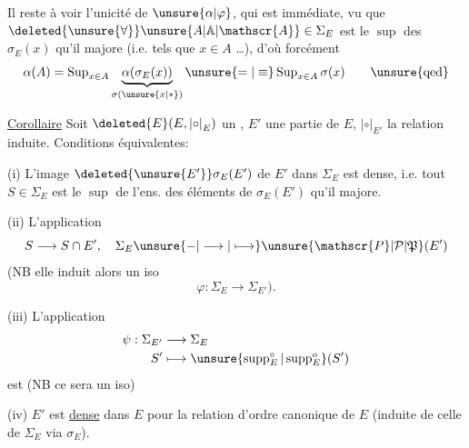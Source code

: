 Il reste à voir l'unicité de $\unsure{\alpha|\varphi}$, qui est immédiate, vu que $\deleted{\unsure{\forall}}\unsure{A|\mathbb{A}|\mathscr{A}}\in\Sigma_E$ est le $\sup$ des $\sigma_E(x)$ qu'il majore (i.e. tels que $x\in A$ \ldots),  d'où forcément
\[
\alpha(A)=\operatorname{Sup}_{x\in A}\underbrace{\alpha(\sigma_E(x))}_{\sigma(\unsure{x|*})}\unsure{=|\equiv}\operatorname{Sup}_{x\in A}\sigma(x)
\qquad\text{\unsure{qed}}
\]


\uline{Corollaire} Soit $\deleted{E}(E,\mathrel{|{\circ}|}_E)$ un , $E'$ une partie de $E$, $\mathrel{|{\circ}|}_{E'}$ la relation induite. Conditions équivalentes:

(i) L'image $\deleted{\unsure{E'}}\sigma_E(E')$ de $E'$ dans $\Sigma_E$ est dense, i.e. tout $S\in\Sigma_E$ est le $\sup$ de l'ens. des éléments de $\sigma_E(E')$ qu'il majore.

(ii)  L'application
\[
S\longrightarrow S\cap E',\quad\Sigma_E\unsure{{-}|\longrightarrow|\longmapsto}\unsure{\mathscr{P}|\mathcal{P}|\mathfrak{P}}(E')
\]
(NB elle induit alors \unsure{$=$|$\simeq$} un iso
\[
\varphi:\Sigma_E\longrightarrow\Sigma_{E'}).
\]

(iii) L'application
\[
\begin{aligned}
\psi:\Sigma_{E'}&\longrightarrow\Sigma_E\\
S'&\longmapsto\unsure{\operatorname{supp}^{\circ}_E|\operatorname{supp}^{o}_E}(S')
\end{aligned}
\]
est  (NB ce sera \unsure{$=$|$\simeq$} un iso)

(iv) $E'$ est \uline{dense} dans $E$ pour la relation d'ordre canonique de $E$ (induite de celle de $\Sigma_E$ via $\sigma_E$).



